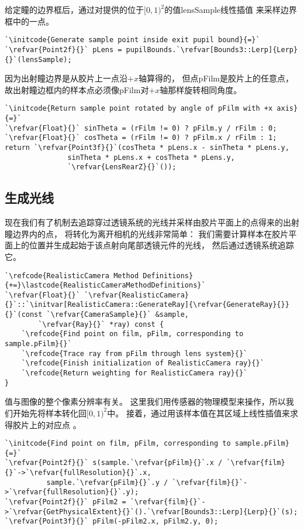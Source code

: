 给定瞳的边界框后，通过对提供的位于$[0,1)^2$的值{\ttfamily lensSample}线性插值
来采样边界框中的一点。
\begin{lstlisting}
`\initcode{Generate sample point inside exit pupil bound}{=}`
`\refvar{Point2f}{}` pLens = pupilBounds.`\refvar[Bounds3::Lerp]{Lerp}{}`(lensSample);
\end{lstlisting}

因为出射瞳边界是从胶片上一点沿$+x$轴算得的，
但点{\ttfamily pFilm}是胶片上的任意点，
故出射瞳边框内的样本点必须像{\ttfamily pFilm}对$+x$轴那样旋转相同角度。
\begin{lstlisting}
`\initcode{Return sample point rotated by angle of pFilm with +x axis}{=}`
`\refvar{Float}{}` sinTheta = (rFilm != 0) ? pFilm.y / rFilm : 0;
`\refvar{Float}{}` cosTheta = (rFilm != 0) ? pFilm.x / rFilm : 1;
return `\refvar{Point3f}{}`(cosTheta * pLens.x - sinTheta * pLens.y,
               sinTheta * pLens.x + cosTheta * pLens.y,
               `\refvar{LensRearZ}{}`());
\end{lstlisting}

\subsection{生成光线}\label{sub:生成光线}
现在我们有了机制去追踪穿过透镜系统的光线并采样由胶片平面上的点得来的出射瞳边界内的点，
将转化为离开相机的光线非常简单：
我们需要计算样本在胶片平面上的位置并生成起始于该点射向尾部透镜元件的光线，
然后通过透镜系统追踪它。
\begin{lstlisting}
`\refcode{RealisticCamera Method Definitions}{+=}\lastcode{RealisticCameraMethodDefinitions}`
`\refvar{Float}{}` `\refvar{RealisticCamera}{}`::`\initvar[RealisticCamera::GenerateRay]{\refvar{GenerateRay}{}}{}`(const `\refvar{CameraSample}{}` &sample,
        `\refvar{Ray}{}` *ray) const {
    `\refcode{Find point on film, pFilm, corresponding to sample.pFilm}{}`
    `\refcode{Trace ray from pFilm through lens system}{}`
    `\refcode{Finish initialization of RealisticCamera ray}{}`
    `\refcode{Return weighting for RealisticCamera ray}{}`
}
\end{lstlisting}

值与图像的整个像素分辨率有关。
这里我们用传感器的物理模型来操作，所以我们开始先将样本转化回$[0,1)^2$中。
接着，通过用该样本值在其区域上线性插值来求得胶片上的对应点
。
\begin{lstlisting}
`\initcode{Find point on film, pFilm, corresponding to sample.pFilm}{=}`
`\refvar{Point2f}{}` s(sample.`\refvar{pFilm}{}`.x / `\refvar{film}{}`->`\refvar{fullResolution}{}`.x,
          sample.`\refvar{pFilm}{}`.y / `\refvar{film}{}`->`\refvar{fullResolution}{}`.y);
`\refvar{Point2f}{}` pFilm2 = `\refvar{film}{}`->`\refvar{GetPhysicalExtent}{}`().`\refvar[Bounds3::Lerp]{Lerp}{}`(s);
`\refvar{Point3f}{}` pFilm(-pFilm2.x, pFilm2.y, 0);
\end{lstlisting}

